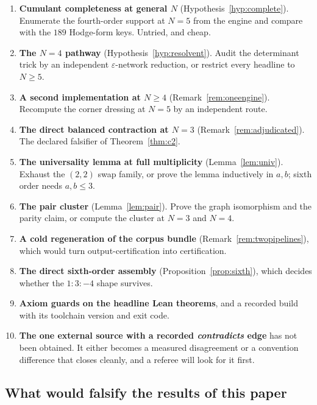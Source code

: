 \documentclass[11pt]{article}
\theoremstyle{definition}
\theoremstyle{remark}
\begin{document}
\begin{enumerate}\itemsep3pt
\item \textbf{Cumulant completeness at general $N$}
  (Hypothesis~\ref{hyp:complete}). Enumerate the fourth-order support at $N=5$
  from the engine and compare with the $189$ Hodge-form keys. Untried, and
  cheap.
\item \textbf{The $N=4$ pathway} (Hypothesis~\ref{hyp:resolvent}). Audit the
  determinant trick by an independent $\varepsilon$-network reduction, or
  restrict every headline to $N\ge5$.
\item \textbf{A second implementation at $N\ge4$} (Remark~\ref{rem:oneengine}).
  Recompute the corner dressing at $N=5$ by an independent route.
\item \textbf{The direct balanced contraction at $N=3$}
  (Remark~\ref{rem:adjudicated}). The declared falsifier of
  Theorem~\ref{thm:c2}.
\item \textbf{The universality lemma at full multiplicity}
  (Lemma~\ref{lem:univ}). Exhaust the $(2,2)$ swap family, or prove the lemma
  inductively in $a,b$; sixth order needs $a,b\le3$.
\item \textbf{The pair cluster} (Lemma~\ref{lem:pair}). Prove the graph
  isomorphism and the parity claim, or compute the cluster at $N=3$ and $N=4$.
\item \textbf{A cold regeneration of the corpus bundle}
  (Remark~\ref{rem:twopipelines}), which would turn output-certification into
  certification.
\item \textbf{The direct sixth-order assembly}
  (Proposition~\ref{prop:sixth}), which decides whether the $1:3:-4$ shape
  survives.
\item \textbf{Axiom guards on the headline Lean theorems}, and a recorded build
  with its toolchain version and exit code.
\item \textbf{The one external source with a recorded \emph{contradicts} edge}
  has not been obtained. It either becomes a measured disagreement or a
  convention difference that closes cleanly, and a referee will look for it
  first.
\end{enumerate}

\subsection{What would falsify the results of this paper}
\end{document}
